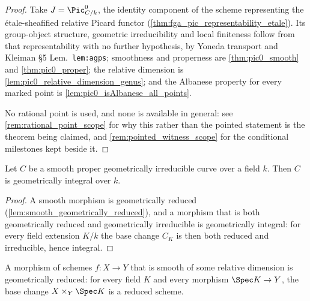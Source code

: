 \begin{proof}
  Take \(J = \Pic^0_{C/k}\), the identity component of the scheme representing the
  \'etale-sheafified relative Picard functor
  (\cref{thm:fga_pic_representability_etale}). Its group-object structure, geometric
  irreducibility and local finiteness follow from that representability with no
  further hypothesis, by Yoneda transport and Kleiman \S 5 Lem.~\texttt{lem:agps};
  smoothness and properness are \cref{thm:pic0_smooth} and \cref{thm:pic0_proper};
  the relative dimension is \cref{lem:pic0_relative_dimension_genus}; and the
  Albanese property for every marked point is
  \cref{lem:pic0_isAlbanese_all_points}.

  No rational point is used, and none is available in general: see
  \cref{rem:rational_point_scope} for why this rather than the pointed statement is
  the theorem being claimed, and \cref{rem:pointed_witness_scope} for the conditional
  milestones kept beside it.
\end{proof}

\begin{lemma}
  \label{lem:curve_geometrically_integral}
  \leanok
  Let \(C\) be a smooth proper geometrically irreducible curve over a field \(k\).
  Then \(C\) is geometrically integral over \(k\).
\end{lemma}

\begin{proof}
  \leanok
  A smooth morphism is geometrically reduced
  (\cref{lem:smooth_geometrically_reduced}), and a morphism that is both
  geometrically reduced and geometrically irreducible is geometrically integral:
  for every field extension \(K/k\) the base change \(C_K\) is then both reduced
  and irreducible, hence integral.
\end{proof}

\begin{lemma}
  \label{lem:smooth_geometrically_reduced}
  \leanok
  A morphism of schemes \(f\colon X\to Y\) that is smooth of some relative
  dimension is geometrically reduced: for every field \(K\) and every morphism
  \(\Spec K\to Y\), the base change \(X\times_Y\Spec K\) is a reduced scheme.
\end{lemma}


